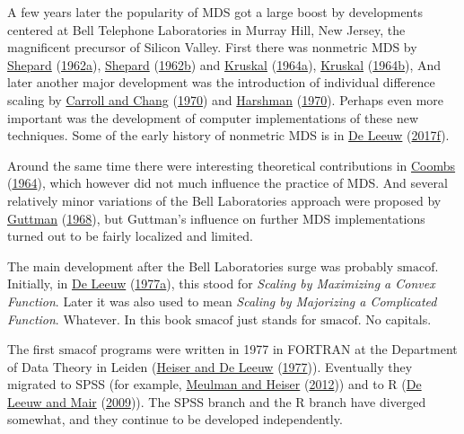 \documentclass[
  12pt,
]{book}
\theoremstyle{definition}
\theoremstyle{definition}
\theoremstyle{definition}
\theoremstyle{definition}
\theoremstyle{remark}
\begin{document}
A few years later the popularity of MDS got a large boost by
developments centered at Bell Telephone Laboratories in Murray Hill, New
Jersey, the magnificent precursor of Silicon Valley. First there was
nonmetric MDS by \protect\hyperlink{ref-shepard_62a}{Shepard} (\protect\hyperlink{ref-shepard_62a}{1962a}), \protect\hyperlink{ref-shepard_62b}{Shepard} (\protect\hyperlink{ref-shepard_62b}{1962b}) and \protect\hyperlink{ref-kruskal_64a}{Kruskal} (\protect\hyperlink{ref-kruskal_64a}{1964a}),
\protect\hyperlink{ref-kruskal_64b}{Kruskal} (\protect\hyperlink{ref-kruskal_64b}{1964b}), And later another major development was the introduction
of individual difference scaling by \protect\hyperlink{ref-carroll_chang_70}{Carroll and Chang} (\protect\hyperlink{ref-carroll_chang_70}{1970}) and \protect\hyperlink{ref-harshman_70}{Harshman} (\protect\hyperlink{ref-harshman_70}{1970}).
Perhaps even more important was the development of computer
implementations of these new techniques. Some of the early history of
nonmetric MDS is in \protect\hyperlink{ref-deleeuw_E_17e}{De Leeuw} (\protect\hyperlink{ref-deleeuw_E_17e}{2017f}).

Around the same time there were interesting theoretical contributions in
\protect\hyperlink{ref-coombs_64}{Coombs} (\protect\hyperlink{ref-coombs_64}{1964}), which however did not much influence the practice of MDS.
And several relatively minor variations of the Bell Laboratories
approach were proposed by \protect\hyperlink{ref-guttman_68}{Guttman} (\protect\hyperlink{ref-guttman_68}{1968}), but Guttman's influence on
further MDS implementations turned out to be fairly localized and
limited.

The main development after the Bell Laboratories surge was probably
\(\textrm{smacof}\). Initially, in \protect\hyperlink{ref-deleeuw_C_77}{De Leeuw} (\protect\hyperlink{ref-deleeuw_C_77}{1977a}), this stood for
\emph{Scaling by Maximizing a Convex Function}.
Later it was also used to mean
\emph{Scaling by Majorizing a Complicated Function}. Whatever. In this book \(\textrm{smacof}\) just stands for \(\textrm{smacof}\). No capitals.

The first \(\textrm{smacof}\) programs were written in 1977 in FORTRAN at the Department of Data Theory in Leiden (\protect\hyperlink{ref-heiser_deleeuw_R_77}{Heiser and De Leeuw} (\protect\hyperlink{ref-heiser_deleeuw_R_77}{1977})). Eventually they migrated to SPSS (for example, \protect\hyperlink{ref-meulman_heiser_12}{Meulman and Heiser} (\protect\hyperlink{ref-meulman_heiser_12}{2012})) and to R (\protect\hyperlink{ref-deleeuw_mair_A_09c}{De Leeuw and Mair} (\protect\hyperlink{ref-deleeuw_mair_A_09c}{2009})). The SPSS branch and the R branch have diverged somewhat, and they continue to be developed independently.
\end{document}
